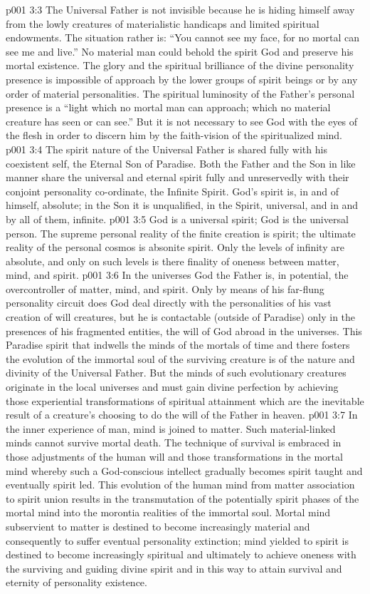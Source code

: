\vs p001 3:3 The Universal Father is not invisible because he is hiding himself away from the lowly creatures of materialistic handicaps and limited spiritual endowments. The situation rather is: “You cannot see my face, for no mortal can see me and live.” No material man could behold the spirit God and preserve his mortal existence. The glory and the spiritual brilliance of the divine personality presence is impossible of approach by the lower groups of spirit beings or by any order of material personalities. The spiritual luminosity of the Father’s personal presence is a “light which no mortal man can approach; which no material creature has seen or can see.” But it is not necessary to see God with the eyes of the flesh in order to discern him by the faith\hyp{}vision of the spiritualized mind.
\pc \vs p001 3:4 The spirit nature of the Universal Father is shared fully with his coexistent self, the Eternal Son of Paradise. Both the Father and the Son in like manner share the universal and eternal spirit fully and unreservedly with their conjoint personality co\hyp{}ordinate, the Infinite Spirit. God’s spirit is, in and of himself, absolute; in the Son it is unqualified, in the Spirit, universal, and in and by all of them, infinite.
\pc \vs p001 3:5 God is a universal spirit; God is the universal person. The supreme personal reality of the finite creation is spirit; the ultimate reality of the personal cosmos is absonite spirit. Only the levels of infinity are absolute, and only on such levels is there finality of oneness between matter, mind, and spirit.
\pc \vs p001 3:6 In the universes God the Father is, in potential, the overcontroller of matter, mind, and spirit. Only by means of his far\hyp{}flung personality circuit does God deal directly with the personalities of his vast creation of will creatures, but he is contactable (outside of Paradise) only in the presences of his fragmented entities, the will of God abroad in the universes. This Paradise spirit that indwells the minds of the mortals of time and there fosters the evolution of the immortal soul of the surviving creature is of the nature and divinity of the Universal Father. But the minds of such evolutionary creatures originate in the local universes and must gain divine perfection by achieving those experiential transformations of spiritual attainment which are the inevitable result of a creature’s choosing to do the will of the Father in heaven.\plusone
\pc \vs p001 3:7 In the inner experience of man, mind is joined to matter. Such material\hyp{}linked minds cannot survive mortal death. The technique of survival is embraced in those adjustments of the human will and those transformations in the mortal mind whereby such a God\hyp{}conscious intellect gradually becomes spirit taught and eventually spirit led. This evolution of the human mind from matter association to spirit union results in the transmutation of the potentially spirit phases of the mortal mind into the morontia realities of the immortal soul. Mortal mind subservient to matter is destined to become increasingly material and consequently to suffer eventual personality extinction; mind yielded to spirit is destined to become increasingly spiritual and ultimately to achieve oneness with the surviving and guiding divine spirit and in this way to attain survival and eternity of personality existence.

